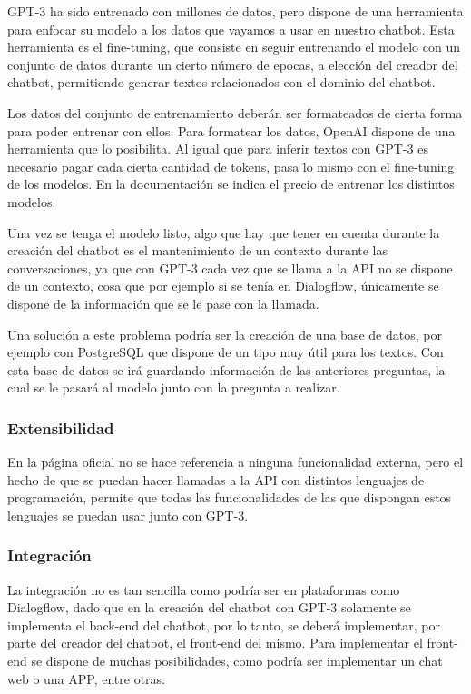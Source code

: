 GPT-3 ha sido entrenado con millones de datos, pero dispone de una herramienta para enfocar su modelo a los datos que vayamos a usar en nuestro chatbot. Esta herramienta es el fine-tuning, que consiste en seguir entrenando el modelo con un conjunto de datos durante un cierto número de \gls{epocas}, a elección del creador del chatbot, permitiendo generar textos relacionados con el dominio del chatbot.

Los datos del conjunto de entrenamiento deberán ser formateados de cierta forma para poder entrenar con ellos. Para formatear los datos, OpenAI dispone de una herramienta que lo posibilita. Al igual que para inferir textos con GPT-3 es necesario pagar cada cierta cantidad de tokens, pasa lo mismo con el fine-tuning de los modelos. En la documentación \cite{RefWorks:RefID:25-openai.} se indica el precio de entrenar los distintos modelos.

Una vez se tenga el modelo listo, algo que hay que tener en cuenta durante la creación del chatbot es el mantenimiento de un contexto durante las conversaciones, ya que con GPT-3 cada vez que se llama a la \gls{API} no se dispone de un contexto, cosa que por ejemplo si se tenía en Dialogflow, únicamente se dispone de la información que se le pase con la llamada.

Una solución a este problema podría ser la creación de una base de datos, por ejemplo con PostgreSQL que dispone de un tipo muy útil para los textos. Con esta base de datos se irá guardando información de las anteriores preguntas, la cual se le pasará al modelo junto con la pregunta a realizar.

\subsubsection*{Extensibilidad}

En la página oficial no se hace referencia a ninguna funcionalidad externa, pero el hecho de que se puedan hacer llamadas a la \gls{API} con distintos lenguajes de programación, permite que todas las funcionalidades de las que dispongan estos lenguajes se puedan usar junto con GPT-3.

\subsubsection*{Integración}

La integración no es tan sencilla como podría ser en plataformas como Dialogflow, dado que en la creación del chatbot con GPT-3 solamente se implementa el \gls{back-end} del chatbot, por lo tanto, se deberá implementar, por parte del creador del chatbot, el \gls{front-end} del mismo. Para implementar el \gls{front-end} se dispone de muchas posibilidades, como podría ser implementar un chat web o una APP, entre otras.

